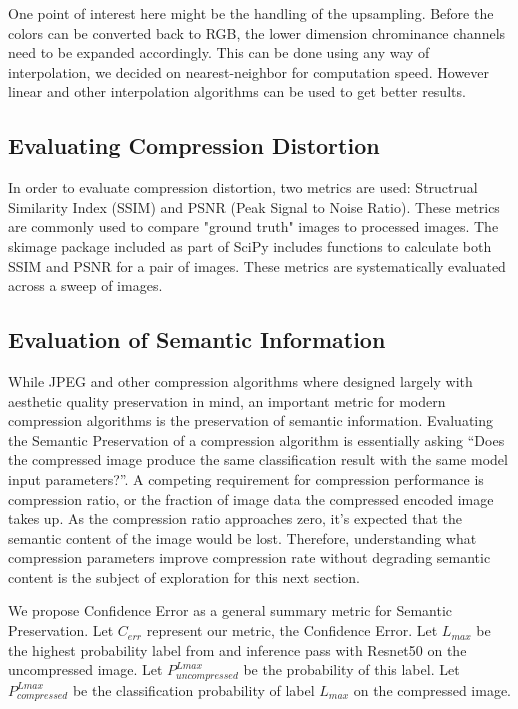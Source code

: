 One point of interest here might be the handling of the upsampling. Before the colors can be converted back to RGB, the lower dimension chrominance channels need to be expanded accordingly. This can be done using any way of interpolation, we decided on nearest-neighbor for computation speed. However linear and other interpolation algorithms can be used to get better results.

\subsection{Evaluating Compression Distortion}

In order to evaluate compression distortion, two metrics are used: Structrual Similarity Index (SSIM) and PSNR (Peak Signal to Noise Ratio). These metrics are commonly used to compare "ground truth" images to processed images. \cite{wang2004image}\cite{psnr} The skimage package included as part of SciPy includes functions to calculate both SSIM and PSNR for a pair of images. These metrics are systematically evaluated across a sweep of images.

\subsection{Evaluation of Semantic Information}

While JPEG and other compression algorithms where designed largely with aesthetic quality preservation in mind, an important metric for modern compression algorithms is the preservation of semantic information. 
Evaluating the Semantic Preservation of a compression algorithm is essentially asking \enquote {Does the compressed image produce the same classification result with the same model input parameters?}. A competing requirement for compression performance is compression ratio, or the fraction of image data the compressed encoded image takes up. As the compression ratio approaches zero, it's expected that the semantic content of the image would be lost. Therefore, understanding what compression parameters improve compression rate without degrading semantic content is the subject of exploration for this next section.

We propose Confidence Error as a general summary metric for Semantic Preservation. Let $C_{err}$ represent our metric, the Confidence Error. Let $L_{max}$ be the highest probability label from and inference pass with Resnet50 on the uncompressed image. Let $P^{Lmax}_{uncompressed}$ be the probability of this label. Let $P^{Lmax}_{compressed}$ be the classification probability of label $L_{max}$ on the compressed image.

